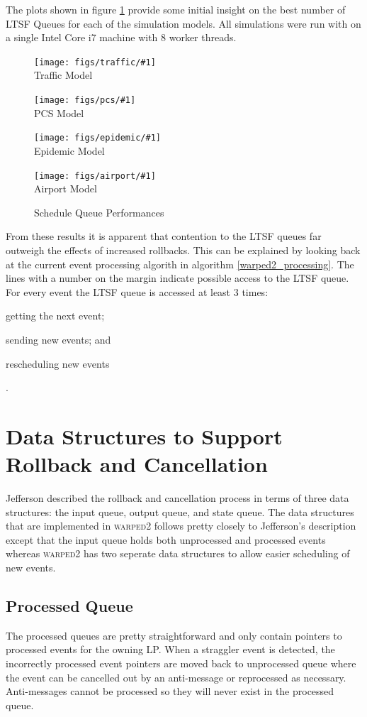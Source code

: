 \documentclass[11pt]{book}
\newcommand{\showPlots}[3]{
  \begin{figure}
    \begin{minipage}{.5\textwidth}
      \begin{center}
        \texttt{[image: figs/traffic/\#1]} \\
        Traffic Model \\
      \end{center}
    \end{minipage} \hfill
    \begin{minipage}{.5\textwidth}
      \begin{center}
        \texttt{[image: figs/pcs/\#1]} \\
        PCS Model \\
      \end{center}
    \end{minipage}
    \begin{minipage}{.5\textwidth}
      \begin{center}
        \texttt{[image: figs/epidemic/\#1]} \\
        Epidemic Model \\
      \end{center}
    \end{minipage} \hfill
    \begin{minipage}{.5\textwidth}
      \begin{center}
        \texttt{[image: figs/airport/\#1]} \\
        Airport Model \\
      \end{center}
    \end{minipage}
    \caption{#3}\label{#2}
  \end{figure}
}
\begin{document}
The plots shown in figure \ref{sq_performance} provide some initial insight on the best
number of LTSF Queues for each of the simulation models. All simulations were run with
on a single Intel Core i7 machine with 8 worker threads.

\showPlots{Schedule Queue Performance.pdf}{sq_performance}{Schedule Queue Performances}

From these results it is apparent that contention to the LTSF queues far outweigh the
effects of increased rollbacks. This can be explained by looking back at the current event
processing algorith in algorithm \ref{warped2_processing}. The lines with a number on the
margin indicate possible access to the LTSF queue.
For every event the LTSF queue is accessed at least 3 times: \begin{inparaenum}[(1)]
\item getting the next event; \item sending new events; and \item rescheduling new events
\end{inparaenum}. %

\section{Data Structures to Support Rollback and Cancellation}

Jefferson\cite{jefferson-85} described the rollback and cancellation process in terms
of three data structures: the input queue, output queue, and state queue. The data structures
that are implemented in \textsc{warped2} follows pretty closely to Jefferson's description
except that the input queue holds both unprocessed and processed events whereas \textsc{warped2}
has two seperate data structures to allow easier scheduling of new events.

\subsection{Processed Queue}
The processed queues are pretty straightforward and only contain pointers to processed
events for the owning LP. When a straggler event is detected, the incorrectly processed
event pointers are moved back to unprocessed queue where the event can be cancelled out by
an anti-message or reprocessed as necessary. Anti-messages cannot be processed so they
will never exist in the processed queue.
\end{document}
